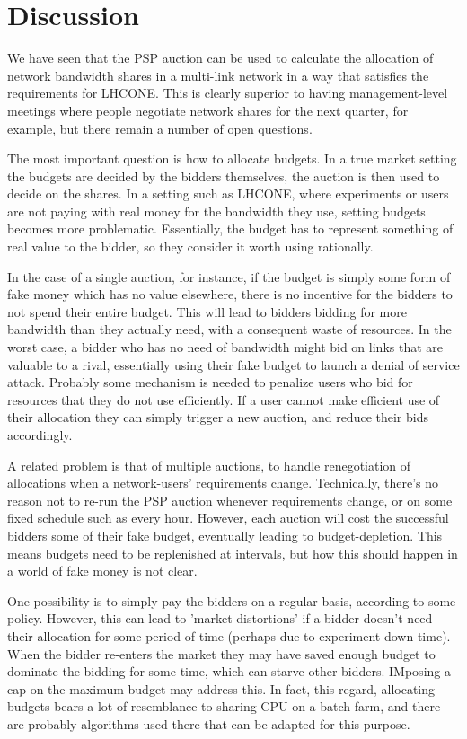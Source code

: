 \section{Discussion}

We have seen that the PSP auction can be used to calculate the allocation of network bandwidth shares in a multi-link network in a way that satisfies the requirements for LHCONE. This is clearly superior to having management-level meetings where people negotiate network shares for the next quarter, for example, but there remain a number of open questions.

The most important question is how to allocate budgets. In a true market setting the budgets are decided by the bidders themselves, the auction is then used to decide on the shares. In a setting such as LHCONE, where experiments or users are not paying with real money for the bandwidth they use, setting budgets becomes more problematic. Essentially, the budget has to represent something of real value to the bidder, so they consider it worth using rationally.

In the case of a single auction, for instance, if the budget is simply some form of fake money which has no value elsewhere, there is no incentive for the bidders to not spend their entire budget. This will lead to bidders bidding for more bandwidth than they actually need, with a consequent waste of resources. In the worst case, a bidder who has no need of bandwidth might bid on links that are valuable to a rival, essentially using their fake budget to launch a denial of service attack. Probably some mechanism is needed to penalize users who bid for resources that they do not use efficiently. If a user cannot make efficient use of their allocation they can simply trigger a new auction, and reduce their bids accordingly.

A related problem is that of multiple auctions, to handle renegotiation of allocations when a network-users' requirements change. Technically, there's no reason not to re-run the PSP auction whenever requirements change, or on some fixed schedule such as every hour. However, each auction will cost the successful bidders some of their fake budget, eventually leading to budget-depletion. This means budgets need to be replenished at intervals, but how this should happen in a world of fake money is not clear.

One possibility is to simply pay the bidders on a regular basis, according to some policy. However, this can lead to 'market distortions' if a bidder doesn't need their allocation for some period of time (perhaps due to experiment down-time). When the bidder re-enters the market they may have saved enough budget to dominate the bidding for some time, which can starve other bidders. IMposing a cap on the maximum budget may address this. In fact, this regard, allocating budgets bears a lot of resemblance to sharing CPU on a batch farm, and there are probably algorithms used there that can be adapted for this purpose.

